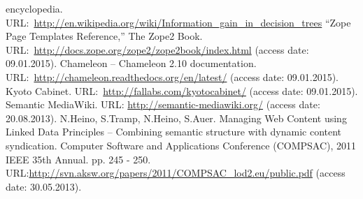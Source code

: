 \documentclass[conference]{IEEEtran}
\begin{document}
\begin{thebibliography}{11}
  encyclopedia. URL:~\url{http://en.wikipedia.org/wiki/Information_gain_in_decision_trees}
 ``Zope Page Templates Reference,'' The Zope2 Book. URL:~\url{http://docs.zope.org/zope2/zope2book/index.html} (access date: 09.01.2015).
 Chameleon -- Chameleon 2.10 documentation.
  URL:~\url{http://chameleon.readthedocs.org/en/latest/}  (access date: 09.01.2015).
 Kyoto Cabinet. URL:~\url{http://fallabs.com/kyotocabinet/} (access date: 09.01.2015).
 Semantic MediaWiki. URL: \url{http://semantic-mediawiki.org/} (access date: 20.08.2013).
 N.Heino, S.Tramp, N.Heino, S.Auer. Managing Web Content using Linked Data Principles – Combining semantic structure with dynamic content syndication. Computer Software and Applications Conference (COMPSAC), 2011 IEEE 35th Annual. pp. 245 - 250. URL:\url{http://svn.aksw.org/papers/2011/COMPSAC_lod2.eu/public.pdf} (access date: 30.05.2013).

\end{thebibliography}
\vspace{-2em}\mbox{} %
\end{document}
